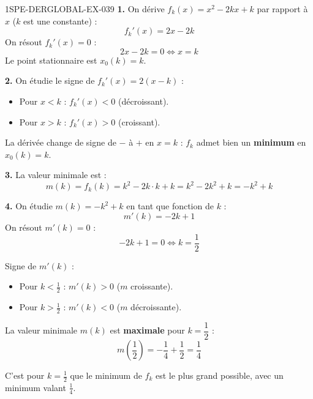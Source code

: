 \begin{corrige}{1SPE-DERGLOBAL-EX-039}
\textbf{1.} On dérive $f_k(x) = x^2 - 2kx + k$ par rapport à $x$ ($k$ est une constante) :
\[
f_k'(x) = 2x - 2k
\]
On résout $f_k'(x) = 0$ :
\[
2x - 2k = 0 \iff x = k
\]
Le point stationnaire est $x_0(k) = k$.

\textbf{2.} On étudie le signe de $f_k'(x) = 2(x - k)$ :
\begin{itemize}
\item Pour $x < k$ : $f_k'(x) < 0$ (décroissant).
\item Pour $x > k$ : $f_k'(x) > 0$ (croissant).
\end{itemize}
La dérivée change de signe de $-$ à $+$ en $x = k$ : $f_k$ admet bien un \textbf{minimum} en $x_0(k) = k$.

\textbf{3.} La valeur minimale est :
\[
m(k) = f_k(k) = k^2 - 2k \cdot k + k = k^2 - 2k^2 + k = -k^2 + k
\]

\textbf{4.} On étudie $m(k) = -k^2 + k$ en tant que fonction de $k$ :
\[
m'(k) = -2k + 1
\]
On résout $m'(k) = 0$ :
\[
-2k + 1 = 0 \iff k = \frac{1}{2}
\]

Signe de $m'(k)$ :
\begin{itemize}
\item Pour $k < \frac{1}{2}$ : $m'(k) > 0$ ($m$ croissante).
\item Pour $k > \frac{1}{2}$ : $m'(k) < 0$ ($m$ décroissante).
\end{itemize}

La valeur minimale $m(k)$ est \textbf{maximale} pour $k = \dfrac{1}{2}$ :
\[
m\!\left(\frac{1}{2}\right) = -\frac{1}{4} + \frac{1}{2} = \boxed{\frac{1}{4}}
\]

C'est pour $k = \frac{1}{2}$ que le minimum de $f_k$ est le plus grand possible, avec un minimum valant $\frac{1}{4}$.
\end{corrige}
